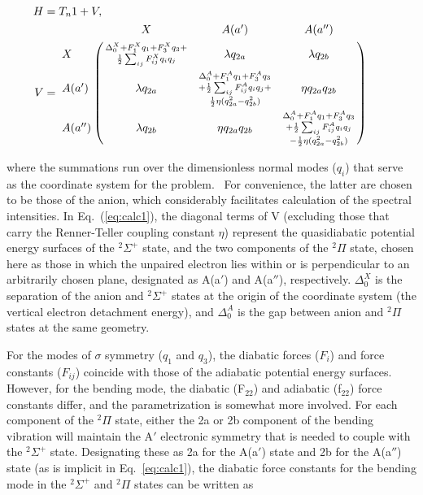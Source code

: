 \documentclass[aip,graphicx]{revtex4-1}
\begin{document}
\begin{align}
H &= T_n1+V,\\
V &= \bordermatrix{ & X & A(a') & A(a'') \cr
	X &\substack{\Delta_0^X+F_1^Xq_1+F_3^Xq_3+\\ 
		\frac{1}{2} \sum_{ij}F^X_{ij}q_iq_j}& \lambda q_{2a} & \lambda q_{2b} \cr
	A(a') & \lambda q_{2a} & \substack{\Delta^A_0+F^A_1q_1+F^A_3q_3\\+\frac{1}{2}\sum_{ij}F^A_{ij}q_iq_j+\\\frac{1}{2}\eta(q_{2a}^2-q_{2b}^2)} & \eta q_{2a}q_{2b} \cr
	A(a'') & \lambda q_{2b} & \eta q_{2a}q_{2b} & \substack{\Delta_0^A+F_1^Aq_1+F_3^Aq_3\\+\frac{1}{2}\sum_{ij}F_{ij}^Aq_iq_j\\-\frac{1}{2}\eta(q_{2a}^2-q_{2b}^2) } } \qquad
\label{eq:calc1}
\end{align}

where the summations run over the dimensionless normal modes ($q_i$) that serve as the coordinate system for the problem.~\cite{sta21,car00} For convenience, the latter are chosen to be those of the anion, which considerably facilitates calculation of the spectral intensities.  In Eq.~(\ref{eq:calc1}), the diagonal terms of V (excluding those that carry the Renner-Teller coupling constant $\eta$) represent the quasidiabatic potential energy surfaces of the $^2\Sigma^+$ state, and the two components of the $^2\Pi$ state, chosen here as those in which the unpaired electron lies within or is perpendicular to an arbitrarily chosen plane, designated as A(a$'$) and A(a$''$), respectively. $\Delta_0^X$ is the separation of the anion and $^2\Sigma^+$ states at the origin of the coordinate system (the vertical electron detachment energy), and $\Delta_0^{A}$ is the gap between anion and $^2\Pi$ states at the same geometry.   

For the modes of $\sigma$ symmetry ($q_1$ and $q_3$), the diabatic forces ($F_i$) and force constants ($F_{ij}$) coincide with those of the adiabatic potential energy surfaces.   However, for the bending mode, the diabatic (F$_{22}$) and adiabatic (f$_{22}$) force constants differ, and the parametrization is somewhat more involved.   For each component of the $^2\Pi$ state, either the 2a or 2b component of the bending vibration will maintain the A$'$ electronic symmetry that is needed to couple with the $^2\Sigma^+$ state.  Designating these as 2a for the A(a$'$) state and 2b for the A(a$''$) state (as is implicit in Eq.~\ref{eq:calc1}), the diabatic force constants for the bending mode in the $^2\Sigma^+$ and $^2\Pi$ states can be written as 
\end{document}

